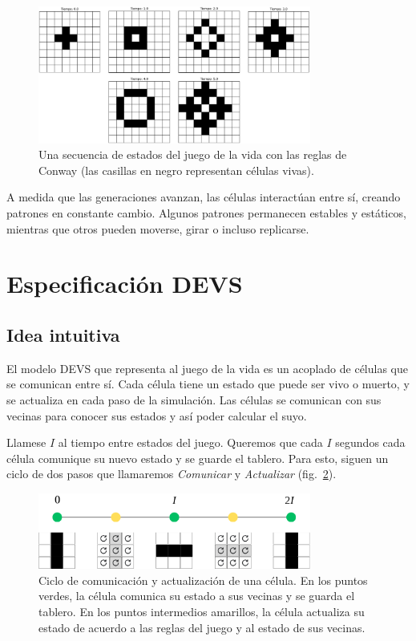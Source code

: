 \documentclass[12pt]{article}
\begin{document}
\begin{figure}
  \centering
  \includegraphics[width=0.8\textwidth]{imagenes/ej1}
  \caption{Una secuencia de estados del juego de la vida con las reglas de Conway (las casillas en negro representan células vivas).}\label{img:ej1}
\end{figure}

A medida que las generaciones avanzan, las células interactúan entre sí, creando patrones en constante cambio. Algunos patrones permanecen estables y estáticos, mientras que otros pueden moverse, girar o incluso replicarse.


\section{Especificación DEVS}


\subsection{Idea intuitiva}


El modelo DEVS que representa al juego de la vida es un acoplado de células que se comunican entre sí. Cada célula tiene un estado que puede ser vivo o muerto, y se actualiza en cada paso de la simulación. Las células se comunican con sus vecinas para conocer sus estados y así poder calcular el suyo.

Llamese $I$ al tiempo entre estados del juego. Queremos que cada $I$ segundos cada célula comunique su nuevo estado y se guarde el tablero. Para esto, siguen un ciclo de dos pasos que llamaremos \textit{Comunicar} y \textit{Actualizar} (fig.~\ref{img:timeline}).

\begin{figure}[ht]
  \centering
  \includegraphics[width=0.8\textwidth]{imagenes/timeline}
  \caption{Ciclo de comunicación y actualización de una célula. En los puntos verdes, la célula comunica su estado a sus vecinas y se guarda el tablero. En los puntos intermedios amarillos, la célula actualiza su estado de acuerdo a las reglas del juego y al estado de sus vecinas.}\label{img:timeline}
\end{figure}
\end{document}
